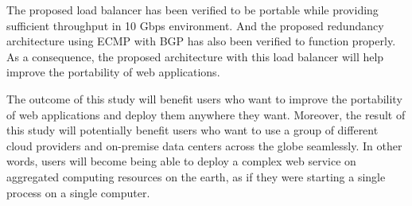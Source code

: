 The proposed load balancer has been verified to be portable while providing  sufficient throughput in 10 Gbps environment.
And the proposed redundancy architecture using ECMP with BGP has also been verified to function properly.
As a consequence, the proposed architecture with this load balancer will help improve the portability of web applications.


The outcome of this study will benefit users who want to improve the portability of web applications and deploy them anywhere they want.
Moreover, the result of this study will potentially benefit users who want to use a group of different cloud providers and on-premise data centers across the globe seamlessly.
In other words, users will become being able to deploy a complex web service on aggregated computing resources on the earth, as if they were starting a single process on a single computer.

